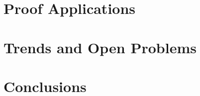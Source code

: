\documentclass{llncs}
\begin{document}
\section{Proof Applications}



\section{Trends and Open Problems}



\section{Conclusions}






\end{document}
